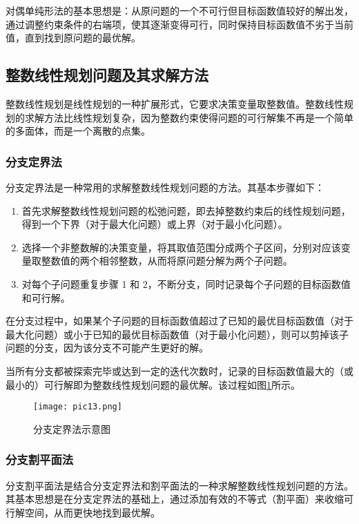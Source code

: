 \documentclass[bachelor]{thesis-uestc}
\begin{document}
对偶单纯形法的基本思想是：从原问题的一个不可行但目标函数值较好的解出发，通过调整约束条件的右端项，使其逐渐变得可行，同时保持目标函数值不劣于当前值，直到找到原问题的最优解。

\subsection{整数线性规划问题及其求解方法}
整数线性规划是线性规划的一种扩展形式，它要求决策变量取整数值。整数线性规划的求解方法比线性规划复杂，因为整数约束使得问题的可行解集不再是一个简单的多面体，而是一个离散的点集。
\subsubsection{分支定界法}
分支定界法是一种常用的求解整数线性规划问题的方法。其基本步骤如下：
\begin{enumerate}
    \item 首先求解整数线性规划问题的松弛问题，即去掉整数约束后的线性规划问题，得到一个下界（对于最大化问题）或上界（对于最小化问题）。
    \item 选择一个非整数解的决策变量，将其取值范围分成两个子区间，分别对应该变量取整数值的两个相邻整数，从而将原问题分解为两个子问题。
    \item 对每个子问题重复步骤 1 和 2，不断分支，同时记录每个子问题的目标函数值和可行解。
\end{enumerate}

在分支过程中，如果某个子问题的目标函数值超过了已知的最优目标函数值（对于最大化问题）或小于已知的最优目标函数值（对于最小化问题），则可以剪掉该子问题的分支，因为该分支不可能产生更好的解。

当所有分支都被探索完毕或达到一定的迭代次数时，记录的目标函数值最大的（或最小的）可行解即为整数线性规划问题的最优解。该过程如图\ref{pic13}所示。

\begin{figure}[h]
    \texttt{[image: pic13.png]}
    \caption{分支定界法示意图}
    \label{pic13}
\end{figure}

\subsubsection{分支割平面法}
分支割平面法是结合分支定界法和割平面法的一种求解整数线性规划问题的方法。其基本思想是在分支定界法的基础上，通过添加有效的不等式（割平面）来收缩可行解空间，从而更快地找到最优解。
\end{document}
